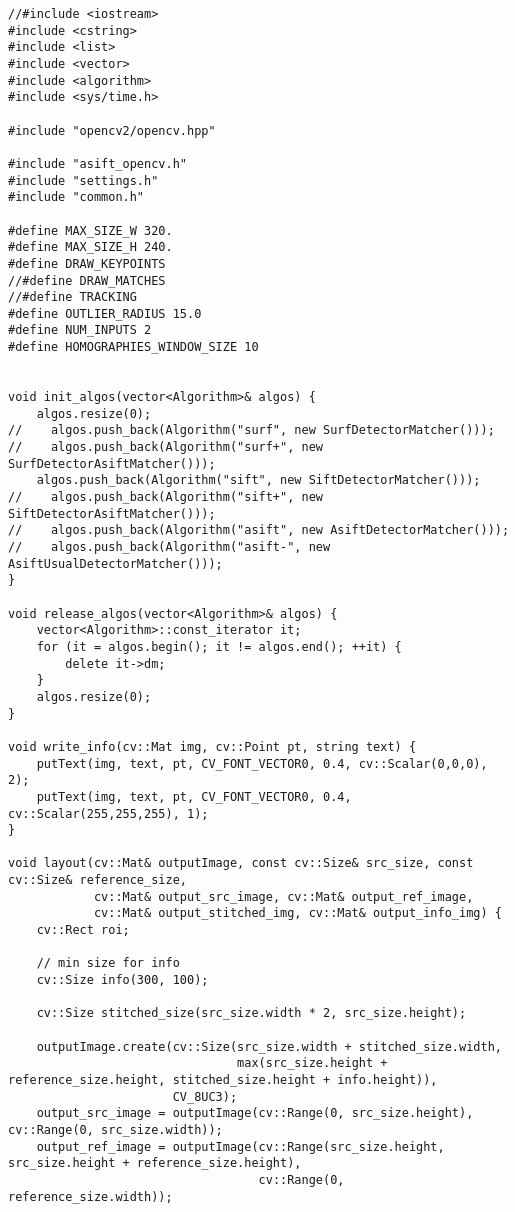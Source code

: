 \begin{lstlisting}
//#include <iostream>
#include <cstring>
#include <list>
#include <vector>
#include <algorithm>
#include <sys/time.h>

#include "opencv2/opencv.hpp"

#include "asift_opencv.h"
#include "settings.h"
#include "common.h"

#define MAX_SIZE_W 320.
#define MAX_SIZE_H 240.
#define DRAW_KEYPOINTS
//#define DRAW_MATCHES
//#define TRACKING
#define OUTLIER_RADIUS 15.0
#define NUM_INPUTS 2
#define HOMOGRAPHIES_WINDOW_SIZE 10


void init_algos(vector<Algorithm>& algos) {
	algos.resize(0);
//    algos.push_back(Algorithm("surf", new SurfDetectorMatcher()));
//    algos.push_back(Algorithm("surf+", new SurfDetectorAsiftMatcher()));
    algos.push_back(Algorithm("sift", new SiftDetectorMatcher()));
//    algos.push_back(Algorithm("sift+", new SiftDetectorAsiftMatcher()));
//    algos.push_back(Algorithm("asift", new AsiftDetectorMatcher()));
//    algos.push_back(Algorithm("asift-", new AsiftUsualDetectorMatcher()));
}

void release_algos(vector<Algorithm>& algos) {	
	vector<Algorithm>::const_iterator it;
	for (it = algos.begin(); it != algos.end(); ++it) {
		delete it->dm;
	}
	algos.resize(0);
}

void write_info(cv::Mat img, cv::Point pt, string text) {	
	putText(img, text, pt, CV_FONT_VECTOR0, 0.4, cv::Scalar(0,0,0), 2);
	putText(img, text, pt, CV_FONT_VECTOR0, 0.4, cv::Scalar(255,255,255), 1);	
}

void layout(cv::Mat& outputImage, const cv::Size& src_size, const cv::Size& reference_size,
            cv::Mat& output_src_image, cv::Mat& output_ref_image, 
            cv::Mat& output_stitched_img, cv::Mat& output_info_img) {
    cv::Rect roi;
    
    // min size for info
    cv::Size info(300, 100);
    
    cv::Size stitched_size(src_size.width * 2, src_size.height);
    
	outputImage.create(cv::Size(src_size.width + stitched_size.width,
                                max(src_size.height + reference_size.height, stitched_size.height + info.height)),
					   CV_8UC3);
	output_src_image = outputImage(cv::Range(0, src_size.height), cv::Range(0, src_size.width));
	output_ref_image = outputImage(cv::Range(src_size.height, src_size.height + reference_size.height),
								   cv::Range(0, reference_size.width));
    

\end{lstlisting}
